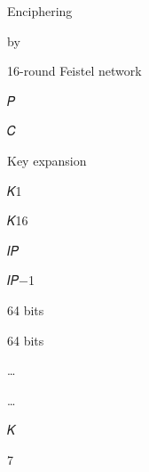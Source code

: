 \documentclass{article}
\begin{document}

Enciphering 

by

16-round Feistel network

𝑃

𝐶

Key expansion

𝐾1

𝐾16

𝐼𝑃

𝐼𝑃−1

64 bits 

64 bits 

…

…

𝐾

7
\end{document}
